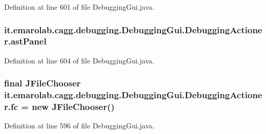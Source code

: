 Definition at line 601 of file Debugging\-Gui.\-java.

\hypertarget{classit_1_1emarolab_1_1cagg_1_1debugging_1_1DebuggingGui_1_1DebuggingActioner_a870189ea85f6c7ed1da689d899f64fdf}{
\subsubsection[{ast\-Panel}]{ it.\-emarolab.\-cagg.\-debugging.\-Debugging\-Gui.\-Debugging\-Actioner.\-ast\-Panel\hspace{0.3cm}{\ttfamily [private]}}}\label{classit_1_1emarolab_1_1cagg_1_1debugging_1_1DebuggingGui_1_1DebuggingActioner_a870189ea85f6c7ed1da689d899f64fdf}


Definition at line 604 of file Debugging\-Gui.\-java.

\hypertarget{classit_1_1emarolab_1_1cagg_1_1debugging_1_1DebuggingGui_1_1DebuggingActioner_ae530a3f533d1fa5c3d3c31e615e9a85e}{
\subsubsection[{fc}]{\setlength{\rightskip}{0pt plus 5cm}final J\-File\-Chooser it.\-emarolab.\-cagg.\-debugging.\-Debugging\-Gui.\-Debugging\-Actioner.\-fc = new J\-File\-Chooser()\hspace{0.3cm}{\ttfamily [private]}}}\label{classit_1_1emarolab_1_1cagg_1_1debugging_1_1DebuggingGui_1_1DebuggingActioner_ae530a3f533d1fa5c3d3c31e615e9a85e}


Definition at line 596 of file Debugging\-Gui.\-java.

